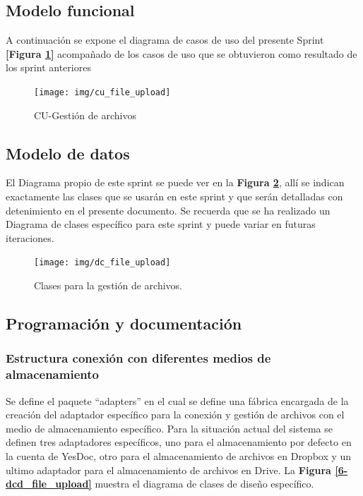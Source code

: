 \subsection{Modelo funcional}  
A continuación se expone el diagrama de casos de uso del presente Sprint \textbf{[Figura \ref{6-cu_file_upload}]} acompañado de los casos de uso que se obtuvieron como resultado de los sprint anteriores


    \begin{figure}[h]
        \centering
        \texttt{[image: img/cu\_file\_upload]}
        \caption{CU-Gestión de archivos}
		\label{6-cu_file_upload}
    \end{figure}
    
\newpage

\subsection{Modelo de datos}
El Diagrama propio de este sprint se puede ver en la \textbf{Figura \ref{6-clases_file_upload}}, allí se indican exactamente las clases que se usarán en este sprint y que serán detalladas con detenimiento en el presente documento. Se recuerda que se ha realizado un Diagrama de clases específico para este sprint y puede variar en futuras iteraciones.
    \begin{figure}[h]
        \centering
        \texttt{[image: img/dc\_file\_upload]}
        \caption{Clases para la gestión de archivos.}
		\label{6-clases_file_upload}
    \end{figure}


\subsection{Programación y documentación} 

\subsubsection{Estructura conexión con diferentes medios de almacenamiento}
	Se define el paquete ``adapters'' en el cual se define una fábrica encargada de la creación del adaptador específico para la conexión y gestión de archivos con el medio de almacenamiento específico. Para la situación actual del sistema se definen tres adaptadores específicos, uno para el almacenamiento por defecto en la cuenta de YesDoc, otro para el almacenamiento de archivos en Dropbox y un ultimo adaptador para el almacenamiento de archivos en Drive. La \textbf{Figura \ref{6-dcd_file_upload}} muestra el diagrama de clases de diseño específico.

